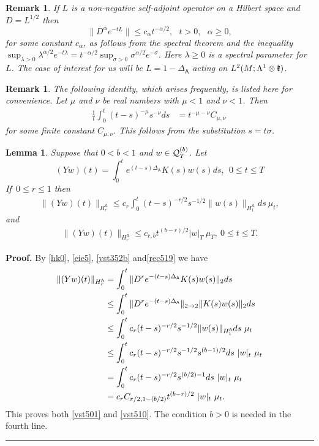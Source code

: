 \documentclass[12pt]{article}
\newtheorem{lemma}[theorem]{Lemma}
\newtheorem{remark}[theorem]{Remark}
\newenvironment{proof}[1][Proof]{\textbf{#1.} }{\ \rule{0.5em}{0.5em}}
\def \As{\mathsf{A}}
\def \Q{{\cal Q}}
\def \kf{\frak k}
\def \beq{\begin{equation}}
\def \eeq{\end{equation}}
\def \eref{\eqref}
\numberwithin{equation}{section}
\begin{document}
        \begin{remark}{\rm  
If $L$ is a non-negative self-adjoint operator
on a Hilbert space and $D = L^{1/2}$ then
\beq
\| D^\alpha e^{-tL}\| \le c_\alpha t^{-\alpha/2},\ \ \  t > 0, \ \ \ \alpha \ge0,     \label{hk0}
\eeq
for some constant $c_\alpha$, as follows from the spectral theorem  and the inequality  
$\sup_{\lambda>0} \lambda^{\alpha/2} e^{-t\lambda} =t^{-\alpha/2} \sup_{\sigma >0} \sigma^{\alpha/2}e^{-\sigma}$.
Here $\lambda \ge 0$ is a spectral parameter for $L$. The case of interest for us
 will be  $L = 1 -\Delta_\As$ acting on $L^2(M; \Lambda^1\otimes \kf)$.
}
\end{remark}

\begin{remark}\label{remcv}{\rm  
The following   identity, which arises frequently,  is listed here for convenience.
Let  $\mu$ and $\nu$ be real numbers with  $ \mu <1$ and  $\nu <1$. Then
\begin{align}
\frac{1}{t} \int_0^t(t-s)^{-\mu} s^{-\nu} ds 
                        &= t^{-\mu -\nu } C_{\mu, \nu}\                            \label{rec519}  
\end{align} 
for some finite constant $C_{\mu,\nu}$. This follows from the substitution $s = t\sigma$.
}
\end{remark}


\begin{lemma} \label{lemestb}
 Suppose that $ 0 < b <1$ and $w \in \Q_T^{(b)}$. Let
\beq
(Yw)(t)  = \int_0^t e^{(t-s) \Delta_\As} K(s) w(s) ds, \ \ 0 \le t \le T                          \label{vst500}
\eeq
If\,  $0\le r \le 1$ then 
\begin{align}
\| (Yw)(t) \|_{H_r^\As} \le c_r \int_0^t (t-s)^{-r/2} s^{-1/2} \| w(s)\|_{H_1^\As} ds\ \mu_t,  \label{vst501}
\end{align}
and
\begin{align}
\| (Yw)(t) \|_{H_r^\As} \le c_{r,b} t^{(b-r)/2} |w|_T\ \mu_T,\   0\le t \le T .                  \label{vst510}
\end{align}
\end{lemma}
       \begin{proof} By \eref{hk0}, \eref{eie5}, \eref{vst352b} and\eref{rec519}  we have
       \begin{align}
 \| (Yw)(t) \|_{H_r^\As} &=\int_0^t \|D^r e^{-(t-s)\Delta_\As} K(s)w(s)\|_2 ds         \notag\\
 &\le \int_0^t   \|D^r e^{-(t-s)\Delta_\As}\|_{2\rightarrow 2} \|K(s) w(s)\|_2 ds      \notag \\
 &\le \int_0^t  c_r (t-s)^{-r/2} s^{-1/2} \|w(s)\|_{H_1^\As}  ds\ \mu_t                \\
 &\le \int_0^t c_r  (t-s)^{-r/2} s^{-1/2} s^{(b-1)/2} ds \ |w|_t \ \mu_t                \notag\\
 &= \int_0^t c_r  (t-s)^{-r/2} s^{(b/2) -1}  ds \ |w|_t \ \mu_t                              \notag \\
 &= c_rC_{r/2, 1-(b/2)} t^{(b-r)/2} \  |w|_t\  \mu_t .
 \end{align}
 This proves both \eref{vst501} and \eref{vst510}. The condition $b >0$ is needed in the fourth line.
 \end{proof}
 
\end{document}
